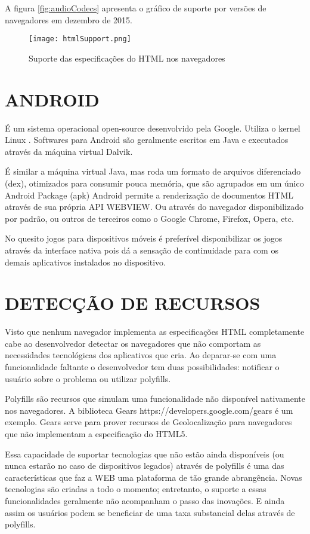 A figura \ref{fig:audioCodecs} apresenta o gráfico de suporte por
versões de navegadores em dezembro de 2015.

\begin{figure}
    \centering
    \texttt{[image: htmlSupport.png]}
	\caption{Suporte das especificações do HTML nos navegadores}
    \label{fig:htmlSupport}
\end{figure}

\section{ANDROID}
\begin{draft}
É um sistema operacional open-source desenvolvido pela Google. Utiliza
o kernel Linux . Softwares para Android são geralmente escritos em Java
e executados através da máquina virtual Dalvik.

É similar a máquina virtual Java, mas roda um formato de arquivos
diferenciado (dex), otimizados para consumir pouca memória, que
são agrupados em um único Android Package (apk) Android permite a
renderização de documentos HTML através de sua própria API WEBVIEW.
Ou através do navegador disponibilizado por padrão, ou outros de
terceiros como o Google Chrome, Firefox, Opera, etc.

No quesito jogos para dispositivos móveis é preferível disponibilizar
os jogos através da interface nativa pois dá a sensação de
continuidade para com os demais aplicativos instalados no dispositivo.
\end{draft}
\section{DETECÇÃO DE RECURSOS}
Visto que nenhum navegador implementa as especificações HTML
completamente cabe ao desenvolvedor detectar os navegadores que não
comportam as necessidades tecnológicas dos aplicativos que cria. Ao
deparar-se com uma funcionalidade faltante o desenvolvedor tem duas
possibilidades: notificar o usuário sobre o problema ou utilizar
polyfills.

Polyfills são recursos que simulam uma funcionalidade não
disponível nativamente nos navegadores. A biblioteca Gears
https://developers.google.com/gears é um exemplo. Gears
serve para prover recursos de Geolocalização para navegadores que
não implementam a especificação do HTML5. 

Essa capacidade de suportar tecnologias que não estão ainda
disponíveis (ou nunca estarão no caso de dispositivos legados)
através de polyfills é uma das características que faz a WEB uma
plataforma de tão grande abrangência. Novas tecnologias são criadas a
todo o momento; entretanto, o suporte a essas funcionalidades geralmente
não acompanham o passo das inovações. E ainda assim os usuários
podem se beneficiar de uma taxa substancial delas através de polyfills.

